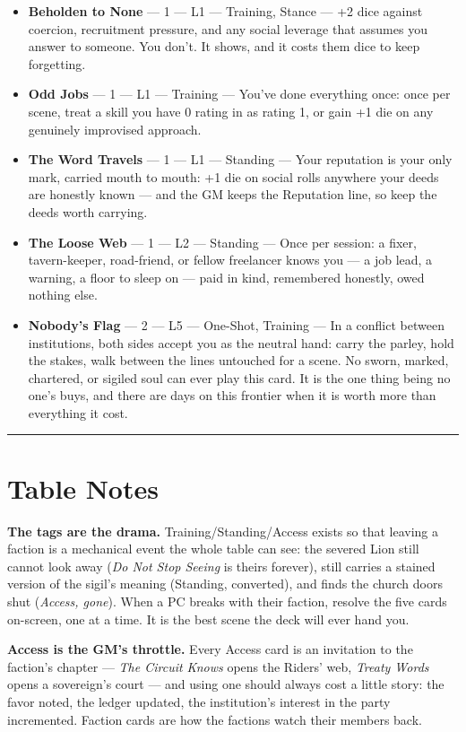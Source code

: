 \begin{itemize}
    \item \textbf{Beholden to None} --- 1 --- L1 --- Training, Stance --- +2 dice against coercion, recruitment pressure, and any social leverage that assumes you answer to someone. You don't. It shows, and it costs them dice to keep forgetting.
    \item \textbf{Odd Jobs} --- 1 --- L1 --- Training --- You've done everything once: once per scene, treat a skill you have 0 rating in as rating 1, or gain +1 die on any genuinely improvised approach.
    \item \textbf{The Word Travels} --- 1 --- L1 --- Standing --- Your reputation is your only mark, carried mouth to mouth: +1 die on social rolls anywhere your deeds are honestly known --- and the GM keeps the Reputation line, so keep the deeds worth carrying.
    \item \textbf{The Loose Web} --- 1 --- L2 --- Standing --- Once per session: a fixer, tavern-keeper, road-friend, or fellow freelancer knows you --- a job lead, a warning, a floor to sleep on --- paid in kind, remembered honestly, owed nothing else.
    \item \textbf{Nobody's Flag} --- 2 --- L5 --- One-Shot, Training --- In a conflict between institutions, both sides accept you as the neutral hand: carry the parley, hold the stakes, walk between the lines untouched for a scene. No sworn, marked, chartered, or sigiled soul can ever play this card. It is the one thing being no one's buys, and there are days on this frontier when it is worth more than everything it cost.
\end{itemize}

\medskip\hrule\medskip

\section*{Table Notes}

\textbf{The tags are the drama.} Training/Standing/Access exists so that leaving a faction is a mechanical event the whole table can see: the severed Lion still cannot look away (\textit{Do Not Stop Seeing} is theirs forever), still carries a stained version of the sigil's meaning (Standing, converted), and finds the church doors shut (\textit{Access, gone}). When a PC breaks with their faction, resolve the five cards on-screen, one at a time. It is the best scene the deck will ever hand you.

\textbf{Access is the GM's throttle.} Every Access card is an invitation to the faction's chapter --- \textit{The Circuit Knows} opens the Riders' web, \textit{Treaty Words} opens a sovereign's court --- and using one should always cost a little story: the favor noted, the ledger updated, the institution's interest in the party incremented. Faction cards are how the factions watch their members back.

